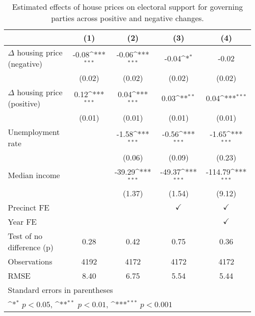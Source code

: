 \begin{table}[htbp]\centering
\def\sym#1{\ifmmode^{#1}\else\(^{#1}\)\fi}
\caption{Estimated effects of house prices on electoral support for governing parties across positive and negative changes.} \label{preposneg}
\begin{tabular}{l*{4}{c}}
\hline\hline
                    &\multicolumn{1}{c}{(1)}         &\multicolumn{1}{c}{(2)}         &\multicolumn{1}{c}{(3)}         &\multicolumn{1}{c}{(4)}         \\
\hline
$\Delta$ housing price (negative)&       -0.08\sym{***}&       -0.06\sym{***}&       -0.04\sym{*}  &       -0.02         \\
                    &      (0.02)         &      (0.02)         &      (0.02)         &      (0.02)         \\
[1em]
$\Delta$ housing price (positive)&        0.12\sym{***}&        0.04\sym{***}&        0.03\sym{**} &        0.04\sym{***}\\
                    &      (0.01)         &      (0.01)         &      (0.01)         &      (0.01)         \\
[1em]
Unemployment rate   &                     &       -1.58\sym{***}&       -0.56\sym{***}&       -1.65\sym{***}\\
                    &                     &      (0.06)         &      (0.09)         &      (0.23)         \\
[1em]
Median income       &                     &      -39.29\sym{***}&      -49.37\sym{***}&     -114.79\sym{***}\\
                    &                     &      (1.37)         &      (1.54)         &      (9.12)         \\
[1em]
\hline Precinct FE  &                     &                     &$\checkmark$         &$\checkmark$         \\
[1em]
Year FE             &                     &                     &                     &$\checkmark$         \\
\hline
Test of no difference (p)&        0.28         &        0.42         &        0.75         &        0.36         \\
Observations        &        4192         &        4172         &        4172         &        4172         \\
RMSE                &        8.40         &        6.75         &        5.54         &        5.44         \\
\hline\hline
\multicolumn{5}{l}{\footnotesize Standard errors in parentheses}\\
\multicolumn{5}{l}{\footnotesize \sym{*} \(p<0.05\), \sym{**} \(p<0.01\), \sym{***} \(p<0.001\)}\\
\end{tabular}
\end{table}
